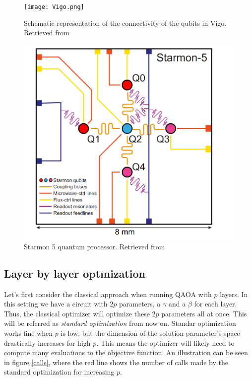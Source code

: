  \begin{figure}
 
    \begin{minipage}{0.5\textwidth}
    \centering
    \texttt{[image: Vigo.png]}  
  \captionsetup{width=.8\linewidth}
    \caption{Schematic representation of the connectivity of the qubits in Vigo. Retrieved from \cite{vigo_ref}}
    \label{vigo}
    \end{minipage}\begin{minipage}{0.5\textwidth}
    \centering
    \includegraphics[width=.52\textwidth]{images/starmon5.png}   
  \captionsetup{width=.8\linewidth}
    \caption{Starmon 5 quantum processor. Retrieved from \cite{starmon_ref}}
    \label{starmon5}
    \end{minipage}

\end{figure}


\subsection{Layer by layer optmization}

Let's first consider the classical approach when running QAOA with $p$ layers. In this setting we have a circuit with $2p$ parameters, a $\gamma$ and a $\beta$ for each layer. Thus, the classical optimizer will optimize these $2p$ parameters all at once. This will be referred as \textit{standard optimization} from now on. Standar optimization works fine when $p$ is low, but the dimension of the solution parameter's space drastically increases for high $p$. This means the optimizer will likely need to compute many evaluations to the objective function. An illustration  can be seen in figure \ref{calls}, where the red line shows the number of calls made by the standard optimization for increasing $p$. 

